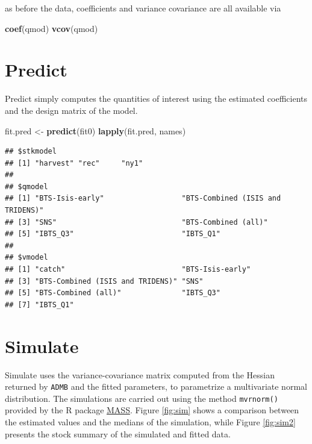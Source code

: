 \documentclass[
]{book}
\newenvironment{Shaded}{\begin{snugshade}}{\end{snugshade}}
\newcommand{\FunctionTok}[1]{\textcolor[rgb]{0.13,0.29,0.53}{\textbf{#1}}}
\newcommand{\NormalTok}[1]{#1}
\newcommand{\OtherTok}[1]{\textcolor[rgb]{0.56,0.35,0.01}{#1}}
\begin{document}
as before the data, coefficients and variance covariance are all available via

\begin{Shaded}
\begin{Highlighting}[]
\FunctionTok{coef}\NormalTok{(qmod)}
\FunctionTok{vcov}\NormalTok{(qmod)}
\end{Highlighting}
\end{Shaded}

\hypertarget{predict}{%
\section{Predict}\label{predict}}

Predict simply computes the quantities of interest using the estimated coefficients and the design matrix of the model.

\begin{Shaded}
\begin{Highlighting}[]
\NormalTok{fit.pred }\OtherTok{\textless{}{-}} \FunctionTok{predict}\NormalTok{(fit0)}
\FunctionTok{lapply}\NormalTok{(fit.pred, names)}
\end{Highlighting}
\end{Shaded}

\begin{verbatim}
## $stkmodel
## [1] "harvest" "rec"     "ny1"    
## 
## $qmodel
## [1] "BTS-Isis-early"                  "BTS-Combined (ISIS and TRIDENS)"
## [3] "SNS"                             "BTS-Combined (all)"             
## [5] "IBTS_Q3"                         "IBTS_Q1"                        
## 
## $vmodel
## [1] "catch"                           "BTS-Isis-early"                 
## [3] "BTS-Combined (ISIS and TRIDENS)" "SNS"                            
## [5] "BTS-Combined (all)"              "IBTS_Q3"                        
## [7] "IBTS_Q1"
\end{verbatim}

\hypertarget{simulate-1}{%
\section{Simulate}\label{simulate-1}}

Simulate uses the variance-covariance matrix computed from the Hessian returned by \texttt{ADMB} and the fitted parameters, to parametrize a multivariate normal distribution. The simulations are carried out using the method \texttt{mvrnorm()} provided by the R package \href{http://cran.r-project.org/web/packages/MASS/}{MASS}. Figure \ref{fig:sim} shows a comparison between the estimated values and the medians of the simulation, while Figure \ref{fig:sim2} presents the stock summary of the simulated and fitted data.
\end{document}
